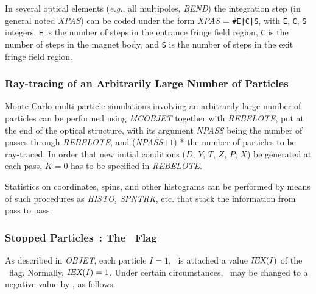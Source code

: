 In several optical elements (\emph{e.g.}, all multipoles, \textsl{BEND}) the 
integration step (in general noted \textsl{XPAS}) can be coded under the 
form \textsl{XPAS} = \texttt{\#E|C|S}, with \texttt{E}, \texttt{C}, \texttt{S} integers, \texttt{E} is the number of
steps  in the entrance fringe field region, \texttt{C} is the number of
steps in the magnet body, and \texttt{S} is the number of steps in the 
exit fringe field region.

\subsubsection{Ray-tracing of an Arbitrarily Large Number of Particles}  
  \label{sec4.6.4}

Monte Carlo  multi-particle simulations involving an 
arbitrarily large number of particles
can be performed using  \textsl{MCOBJET} together with \textsl{REBELOTE}, put at the end of the optical
structure, with its argument \textsl{NPASS} being the number of passes through 
\textsl{REBELOTE}, and (\textsl{NPASS}$+ 1$) * \IMAX{}  
the number of particles to 
be ray-traced. In order that new initial conditions  ($D$, $Y$, $T$, $Z$, 
$P$, $X$) 
 be generated at each pass, $ K=0 $ has to be specified in \textsl{REBELOTE}.
 
\noindent Statistics on coordinates, spins, and other histograms can be
performed by means of such procedures as \textsl{HISTO, SPNTRK}, 
etc. that stack the information from pass to pass. 


\subsubsection{Stopped Particles~: The \IEX\ Flag} 
\label{sec4.6.6}

As described in \textsl{OBJET}, each particle $I=1$, \IMAX\
 is attached a
value $\textsl{IEX}(I)$ of the \IEX\ flag. Normally, $\textsl{IEX}(I)=1$. Under certain 
circumstances, \IEX\ may be changed to a negative value by \zgoubi, as follows. 

